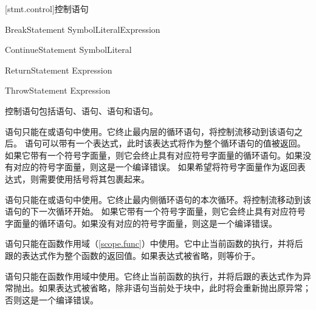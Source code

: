 [stmt.control]{控制语句}

\begin{bnf}{BreakStatement}
     SymbolLiteral\bnfq Expression\bnfq \terminal{;}
\end{bnf}

\begin{bnf}{ContinueStatement}
     SymbolLiteral\bnfq \terminal{;}
\end{bnf}

\begin{bnf}{ReturnStatement}
     Expression\bnfq \terminal{;}
\end{bnf}

\begin{bnf}{ThrowStatement}
     Expression\bnfq \terminal{;}
\end{bnf}

\pnum
控制语句包括语句、语句、语句和语句。

\pnum
{}语句只能在或语句中使用。它终止最内层的循环语句，将控制流移动到该语句之后。
语句可以带有一个表达式，此时该表达式将作为整个循环语句的值被返回。
如果它带有一个符号字面量，则它会终止具有对应符号字面量的循环语句。如果没有对应的符号字面量，则这是一个编译错误。
\enternote 如果希望将符号字面量作为返回表达式，则需要使用括号将其包裹起来。 \exitnote

\pnum
{}语句只能在或语句中使用。它终止最内侧循环语句的本次循环。将控制流移动到该语句的下一次循环开始。
如果它带有一个符号字面量，则它会终止具有对应符号字面量的循环语句。如果没有对应的符号字面量，则这是一个编译错误。

\pnum
{}语句只能在函数作用域（\ref{scope.func}）中使用。它中止当前函数的执行，并将后跟的表达式作为整个函数的返回值。如果表达式被省略，则等价于\tcode{()}。

\pnum
{}语句只能在函数作用域中使用。它终止当前函数的执行，并将后跟的表达式作为异常抛出。如果表达式被省略，除非语句当前处于块中，此时将会重新抛出原异常；否则这是一个编译错误。
